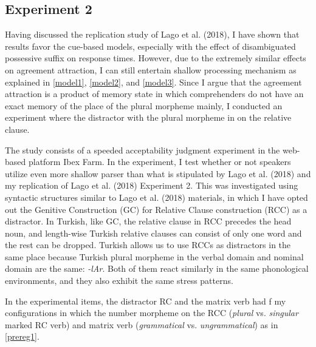 \documentclass[doc]{apa6}
\begin{document}
\hypertarget{experiment-2}{%
\subsection{Experiment 2}\label{experiment-2}}

Having discussed the replication study of Lago et al. (2018), I have shown that results favor the cue-based models, especially with the effect of disambiguated possessive suffix on response times. However, due to the extremely similar effects on agreement attraction, I can still entertain shallow processing mechanism as explained in \autoref{model1}, \autoref{model2}, and \autoref{model3}. Since I argue that the agreement attraction is a product of memory state in which comprehenders do not have an exact memory of the place of the plural morpheme mainly, I conducted an experiment where the distractor with the plural morpheme in on the relative clause.

The study consists of a speeded acceptability judgment experiment in the web-based platform Ibex Farm. In the experiment, I test whether or not speakers utilize even more shallow parser than what is stipulated by Lago et al. (2018) and my replication of Lago et al. (2018) Experiment 2. This was investigated using syntactic structures similar to Lago et al. (2018) materials, in which I have opted out the Genitive Construction (GC) for Relative Clause construction (RCC) as a distractor. In Turkish, like GC, the relative clause in RCC precedes the head noun, and length-wise Turkish relative clauses can consist of only one word and the rest can be dropped. Turkish allows us to use RCCs as distractors in the same place because Turkish plural morpheme in the verbal domain and nominal domain are the same: \emph{-lAr}. Both of them react similarly in the same phonological environments, and they also exhibit the same stress patterns.

In the experimental items, the distractor RC and the matrix verb had f my configurations in which the number morpheme on the RCC (\emph{plural} vs. \emph{singular} marked RC verb) and matrix verb (\emph{grammatical} vs. \emph{ungrammatical}) as in \autoref{prereg1}.
\end{document}
